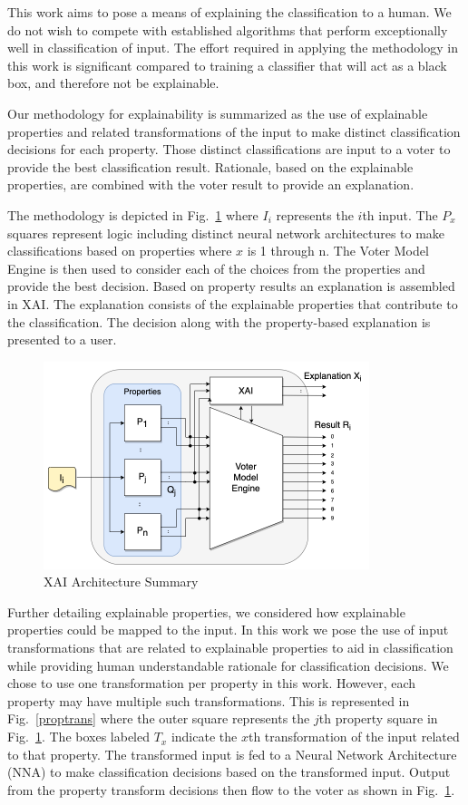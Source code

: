\documentclass[conference]{IEEEtran}
\begin{document}
This work aims to pose a means of explaining the classification to a human.  We do not wish to compete with established algorithms that perform exceptionally well in classification of input.   The effort required in applying the methodology in this work is significant compared to training a classifier that will act as a black box, and therefore not be explainable.

Our methodology for explainability is summarized as the use of explainable properties and related transformations of the input to make distinct classification decisions for each property.  Those distinct classifications are input to a voter to provide the best classification result.  Rationale, based on the explainable properties, are combined with the voter result to provide an explanation. 

The methodology is depicted in Fig.~\ref{voting} where $I_i$ represents the $i$th input.  The $P_x$ squares represent logic including distinct neural network architectures to make classifications based on properties where $x$ is 1 through n.  The Voter Model Engine is then used to consider each of the choices from the properties and provide the best decision.  Based on property results an explanation is assembled in XAI.   The explanation consists of the explainable properties that contribute to the classification.   The decision along with the property-based explanation is presented to a user.

 \begin{figure}[htbp]
\centerline{\includegraphics[width=95mm]{./images/voting_prop_nn_2.png}}
\caption{XAI Architecture Summary}
\label{voting}
\end{figure}

Further detailing explainable properties, we considered how explainable properties could be mapped to the input.  In this work we pose the use of input transformations that are related to explainable properties to aid in classification while providing human understandable rationale for classification decisions.  We chose to use one transformation per property in this work.  However, each property may have multiple such transformations.  This is represented in Fig.~\ref{proptrans} where the outer square represents the $j$th property square in Fig.~\ref{voting}.  The boxes labeled $T_x$ indicate the $x$th transformation of the input related to that property.  The transformed input is fed to a Neural Network Architecture (NNA) to make classification decisions based on the transformed input.  Output from the property transform decisions then flow to the voter as shown in Fig.~\ref{voting}.
\end{document}
